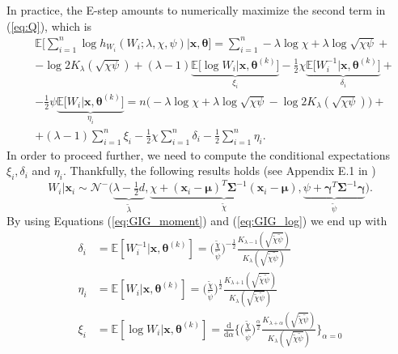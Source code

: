 In practice, the E-step amounts to numerically maximize the second term in (\ref{eq:Q}), which is
\begin{align}\label{eq:ML_function_second_term}
&\mathbb{E}\bigg[\sum_{i=1}^{n}\log h_{W_i}(W_i;\lambda,\chi,\psi)\Big| \bm{x},\bm{\theta}\bigg]  = \sum_{i=1}^{n} -\lambda\log \chi + \lambda\log \sqrt{\chi\psi}+ \\\nonumber
&  -\log 2K_{\lambda}(\sqrt{\chi\psi}) + (\lambda-1)\underbrace{\mathbb{E}\big[\log W_i \lvert \bm{x},\bm{\theta}^{(k)}\big]}_{\xi_i}-\tfrac{1}{2}\chi\underbrace{\mathbb{E}\big[W_i^{-1} \lvert \bm{x},\bm{\theta}^{(k)}\big]}_{\delta_i} + \\\nonumber
& -\tfrac{1}{2}\psi\underbrace{\mathbb{E}\big[W_i \lvert \bm{x},\bm{\theta}^{(k)}\big]}_{\eta_i} = n\big(-\lambda\log \chi + \lambda\log \sqrt{\chi\psi}-\log 2K_{\lambda}(\sqrt{\chi\psi})\big) + \\\nonumber
&+(\lambda-1)\sum_{i=1}^{n}\xi_i-\tfrac{1}{2}\chi\sum_{i=1}^{n}\delta_i-\tfrac{1}{2}\sum_{i=1}^{n}\eta_i.
\end{align}
In order to proceed further, we need to compute the conditional expectations $\xi_i,\delta_i$ and $\eta_i$. Thankfully, the following results holds (see Appendix E.1 in \cite{Brey2013})
\[  W_i\lvert \bm{x}_i \sim \mathcal{N}^-\big(\underbrace{\lambda-\tfrac{1}{2}d}_{\widetilde{\lambda}},\underbrace{\chi + (\bm{x}_i-\bm{\mu})^T \bm{\Sigma}^{-1}(\bm{x}_i-\bm{\mu})}_{\widetilde{\chi}},\underbrace{\psi+\bm{\gamma}^T\bm{\Sigma}^{-1}\bm{\gamma}}_{\widetilde{\psi}}\big). \]
By using Equations (\ref{eq:GIG_moment}) and (\ref{eq:GIG_log}) we end up with
\begin{align}\label{eq:delta}
\delta_i & = \mathbb{E}[W_i^{-1}\lvert \bm{x},\bm{\theta}^{(k)}] = \Big(\frac{\widetilde{\chi}}{\widetilde{\psi}}\Big)^{-\frac{1}{2}}\frac{K_{\lambda-1}(\sqrt{\widetilde{\chi}\widetilde{\psi}})}{K_{\lambda}(\sqrt{\widetilde{\chi}\widetilde{\psi}})} \\[20pt]
\label{eq:eta}
\eta_i & = \mathbb{E}[W_i\lvert \bm{x},\bm{\theta}^{(k)}] = \Big(\frac{\widetilde{\chi}}{\widetilde{\psi}}\Big)^{\frac{1}{2}}\frac{K_{\lambda+1}(\sqrt{\widetilde{\chi}\widetilde{\psi}})}{K_{\lambda}(\sqrt{\widetilde{\chi}\widetilde{\psi}})}\\[20pt]
\label{eq:csi}
\xi_i & = \mathbb{E}[\log W_i\lvert \bm{x},\bm{\theta}^{(k)}]= \frac{\mathrm{d}}{\mathrm{d}\alpha}\Bigg\{\Big(\frac{\widetilde{\chi}}{\widetilde{\psi}}\Big)^{\frac{\alpha}{2}}\frac{K_{\lambda+\alpha}(\sqrt{\widetilde{\chi}\widetilde{\psi}})}{K_{\lambda}(\sqrt{\widetilde{\chi}\widetilde{\psi}})}\Bigg\}_{\alpha=0}
\end{align}
